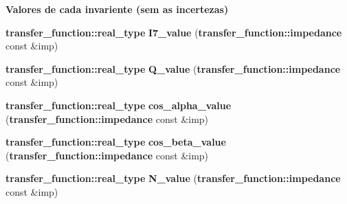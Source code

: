 \begin{Indent}{\bf Valores de cada invariente (sem as incertezas)}
\begin{CompactItemize}
\item 
{\bf transfer\_\-function::real\_\-type} \textbf{I7\_\-value} ({\bf transfer\_\-function::impedance} const \&imp)\label{namespaceerro__manual_1_1base__xi__eta_1_1wal__invariant_ac621bdae48f290e295371c1c24bdad6}

\item 
{\bf transfer\_\-function::real\_\-type} \textbf{Q\_\-value} ({\bf transfer\_\-function::impedance} const \&imp)\label{namespaceerro__manual_1_1base__xi__eta_1_1wal__invariant_3650c74f743142b3e11e4d51fd4847de}

\item 
{\bf transfer\_\-function::real\_\-type} \textbf{cos\_\-alpha\_\-value} ({\bf transfer\_\-function::impedance} const \&imp)\label{namespaceerro__manual_1_1base__xi__eta_1_1wal__invariant_88a1270f8c9002a97427c4965b3a3082}

\item 
{\bf transfer\_\-function::real\_\-type} \textbf{cos\_\-beta\_\-value} ({\bf transfer\_\-function::impedance} const \&imp)\label{namespaceerro__manual_1_1base__xi__eta_1_1wal__invariant_55b72a2e94bc4f928c45b8e21ea0f70b}

\item 
{\bf transfer\_\-function::real\_\-type} \textbf{N\_\-value} ({\bf transfer\_\-function::impedance} const \&imp)\label{namespaceerro__manual_1_1base__xi__eta_1_1wal__invariant_2e97fad7431d24fbb9408bf74476fb7a}

\end{CompactItemize}
\end{Indent}
